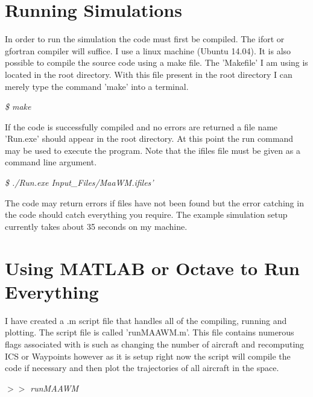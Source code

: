 \documentclass[letterpaper]{article}
\begin{document}
\section{Running Simulations}

In order to run the simulation the code must first be compiled. The
ifort or gfortran compiler will suffice. I use a linux machine (Ubuntu
14.04). It is also possible to compile the source code using a
make file. The 'Makefile' I am using is located in the root
directory. With this file present in the root directory I can merely
type the command 'make' into a terminal.

{\it \$ make}

If the code is successfully compiled and no errors are returned a file
name 'Run.exe' should appear in the root directory. At this point the
run command may be used to execute the program. Note that the ifiles
file must be given as a command line argument.

{\it \$ ./Run.exe Input\_Files/MaaWM.ifiles'}

The code may return errors if files have not been found but the error
catching in the code should catch everything you require. The example
simulation setup currently takes about 35 seconds on my machine. 

\section{Using MATLAB or Octave to Run Everything}

I have created a .m script file that handles all of the compiling,
running and plotting. The script file is called 'runMAAWM.m'. This
file contains numerous flags associated with is such as changing the
number of aircraft and recomputing ICS or Waypoints however as it is
setup right now the script will compile the code if necessary and then
plot the trajectories of all aircraft in the space.

{\it $>>$ runMAAWM}
\end{document}
